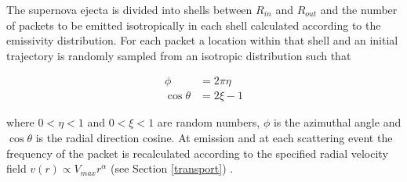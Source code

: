 \documentclass[useAMS,usenatbib,usegraphicx]{mnras}
\begin{document}
The supernova ejecta is divided into shells between $R_{in}$ and $R_{out}$ 
and the number of packets to be emitted isotropically in each shell calculated according 
to the emissivity distribution.  For each packet 
a location within that shell and an initial trajectory is randomly sampled 
from an isotropic distribution such that

\begin{align}
\phi&=2\pi\eta \\
 \cos \theta&=2\xi -1
\end{align}

\noindent where $0<\eta<1$ and $0<\xi<1$ are random numbers, $\phi$ is the 
azimuthal angle and $\cos \theta$ is the radial direction cosine.  At 
emission and at each scattering event the frequency of the packet is 
recalculated according to the specified radial velocity field $v(r) 
\propto V_{max}r^{\alpha}$ (see Section \ref{transport}) .
\end{document}
